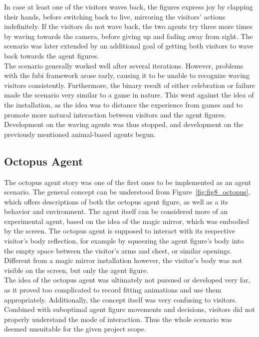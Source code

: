 \documentclass[draft,final]{vutinfth} %
\begin{document}
In case at least one of the \glspl{visitor} waves back, the figures express joy by clapping their hands, before switching back to \gls{live}, mirroring the \glspl{visitor}’ actions indefinitely. 
If the \glspl{visitor} do not wave back, the two agents try three more times by waving towards the camera, before giving up and fading away from sight. 
The scenario was later extended by an additional goal of getting both \glspl{visitor} to wave back towards the \glspl{agent figure}. \\
The scenario generally worked well after several iterations. 
However, problems with the \gls{fubi} framework arose early, causing it to be unable to recognize waving \glspl{visitor} consistently. 
Furthermore, the binary result of either celebration or failure made the scenario very similar to a game in nature. 
This went against the idea of the installation, as the idea was to distance the experience from games and to promote more natural interaction between \glspl{visitor} and the \glspl{agent figure}. 
Development on the waving agents was thus stopped, and development on the previously mentioned animal-based agents begun.

\subsection{Octopus Agent}
\label{chap:octopus}

The octopus agent story was one of the first ones to be implemented as an agent scenario. 
The general concept can be understood from Figure~\ref{fig:fig8_octopus}, which offers descriptions of both the octopus \gls{agent figure}, as well as a its behavior and environment. 
The agent itself can be considered more of an experimental agent, based on the idea of the magic mirror, which was embodied by the screen. 
The octopus agent is supposed to interact with its respective \gls{visitor}’s body reflection, for example by squeezing the \gls{agent figure}’s body into the empty space between the \gls{visitor}’s arms and chest, or similar openings.
Different from a magic mirror installation however, the \gls{visitor}’s body was not visible on the screen, but only the \gls{agent figure}. \\
The idea of the octopus agent was ultimately not pursued or developed very far, as it proved too complicated to record fitting animations and use them appropriately. 
Additionally, the concept itself was very confusing to \glspl{visitor}. 
Combined with suboptimal \gls{agent figure} movements and decisions, \glspl{visitor} did not properly understand the mode of interaction. 
Thus the whole scenario was deemed unsuitable for the given project scope.
\end{document}
